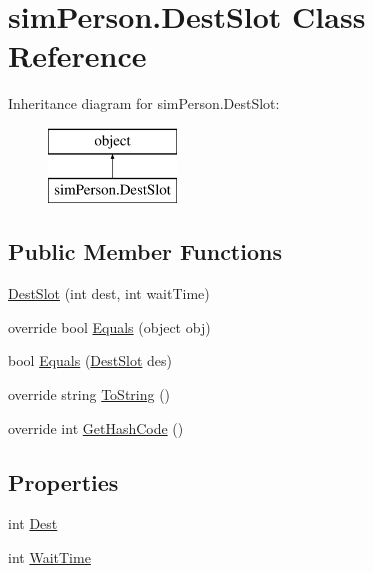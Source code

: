 \hypertarget{classsim_person_1_1_dest_slot}{}\section{sim\+Person.\+Dest\+Slot Class Reference}
\label{classsim_person_1_1_dest_slot}
Inheritance diagram for sim\+Person.\+Dest\+Slot\+:\begin{figure}[H]
\begin{center}
\leavevmode
\includegraphics[height=2.000000cm]{classsim_person_1_1_dest_slot}
\end{center}
\end{figure}
\subsection*{Public Member Functions}
\begin{DoxyCompactItemize}
\item 
\hyperlink{classsim_person_1_1_dest_slot_aa6596787998f78f3f15dc8de2a7a3ede}{Dest\+Slot} (int dest, int wait\+Time)
\item 
override bool \hyperlink{classsim_person_1_1_dest_slot_a212d339d7ee8672bea7c06e3ce09a9a4}{Equals} (object obj)
\item 
bool \hyperlink{classsim_person_1_1_dest_slot_abda5a5382912f7eaa87ae75363a9cd81}{Equals} (\hyperlink{classsim_person_1_1_dest_slot}{Dest\+Slot} des)
\item 
override string \hyperlink{classsim_person_1_1_dest_slot_acc639bb6bf443fc68c0c591e5440c3de}{To\+String} ()
\item 
override int \hyperlink{classsim_person_1_1_dest_slot_aedbbf932f62b4aae95b842ebd5519d84}{Get\+Hash\+Code} ()
\end{DoxyCompactItemize}
\subsection*{Properties}
\begin{DoxyCompactItemize}
\item 
int \hyperlink{classsim_person_1_1_dest_slot_ab8e2c3efcdc50551870cb472ea4dc85b}{Dest}
\item 
int \hyperlink{classsim_person_1_1_dest_slot_a6ab5b25156f6631d1e3b5c66e274f0d3}{Wait\+Time}
\end{DoxyCompactItemize}


